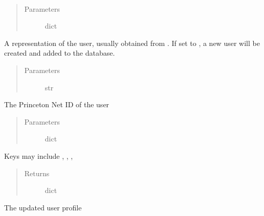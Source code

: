 \documentclass[letterpaper,10pt,english]{sphinxmanual}
\begin{document}
\begin{fulllineitems}
\label{\detokenize{tiger_leagues/models/readme:tiger_leagues.models.user_model.update_user_profile}}~\begin{quote}\begin{description}
\item[{Parameters}] \leavevmode
{} \textendash{} dict

\end{description}\end{quote}

A representation of the user, usually obtained from . If 
set to , a new user will be created and added to the database.
\begin{quote}\begin{description}
\item[{Parameters}] \leavevmode
{} \textendash{} str

\end{description}\end{quote}

The Princeton Net ID of the user
\begin{quote}\begin{description}
\item[{Parameters}] \leavevmode
{} \textendash{} dict

\end{description}\end{quote}

Keys may include , , , 
\begin{quote}\begin{description}
\item[{Returns}] \leavevmode
dict

\end{description}\end{quote}

The updated user profile

\end{fulllineitems}
\end{document}

